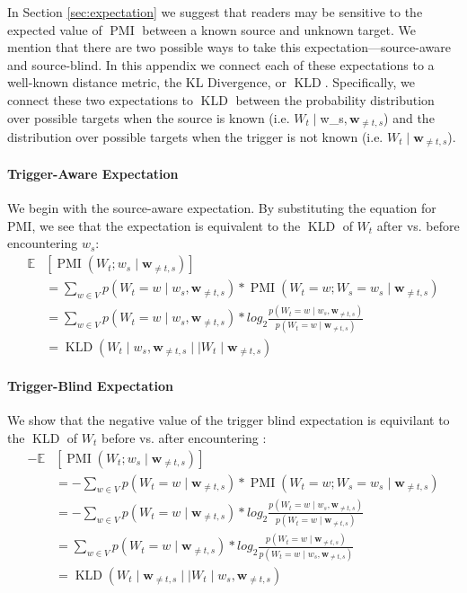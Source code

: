 \documentclass[12pt]{article}
\newcommand{\targetindex}{t}
\newcommand{\sourceindex}{s}
\newcommand{\bothindex}{\targetindex, \sourceindex}
\newcommand{\Target}{$W_{\targetindex}$\xspace}
\newcommand{\Targetmath}{W_{\targetindex}}
\newcommand{\source}{$w_{\sourceindex}$\xspace}
\newcommand{\Sourcemath}{W_{\sourceindex}}
\newcommand{\sourcemath}{w_{\sourceindex}\xspace}
\newcommand{\bw}{\mathbf{w}}
\newcommand{\maskbothmath}{\bw_{\neq \bothindex}}
\newcommand{\pmimath}{\operatorname{PMI}}
\newcommand{\pmi}{$\pmimath$\xspace}
\newcommand{\kldmath}{\operatorname{KLD}}
\newcommand{\kld}{$\kldmath$\xspace}
\begin{document}
In Section \ref{sec:expectation} we suggest that readers may be sensitive to the expected value of \pmi between a known source and unknown target. We mention that there are two possible ways to take this expectation---source-aware and source-blind. In this appendix we connect each of these expectations to a well-known distance metric, the KL Divergence, or \kld. Specifically, we connect these two expectations to \kld between the probability distribution over possible targets when the source is known (i.e. $\Targetmath \mid \source, \maskbothmath$) and the distribution over possible targets when the trigger is not known (i.e. $\Targetmath \mid \maskbothmath$).

\paragraph{Trigger-Aware Expectation} We begin with the source-aware expectation. By substituting the equation for PMI, we see that the expectation is equivalent to the \kld of \Target after vs. before encountering \source:
%
\begin{align}
    \mathbb{E}&[\pmimath(\Targetmath;\sourcemath \mid \maskbothmath)] \nonumber \\
    &= \sum_{w \in V} p(\Targetmath = w \mid \sourcemath, \maskbothmath) * \pmimath(\Targetmath = w; \Sourcemath = \sourcemath \mid \maskbothmath) \\
    &= \sum_{w \in V} p(\Targetmath = w \mid \sourcemath, \maskbothmath) * log_2 \frac{p(\Targetmath = w \mid \sourcemath, \maskbothmath)}{p(\Targetmath = w \mid \maskbothmath)} \\
    &= \kldmath(\Targetmath \mid \sourcemath, \maskbothmath \mid \mid \Targetmath \mid \maskbothmath )
\end{align}

\paragraph{Trigger-Blind Expectation} We show that the negative value of the trigger blind expectation is equivilant to the \kld of \Target before vs. after encountering \trigger:
%
\begin{align}
    - \mathbb{E}&[\pmimath(\Targetmath;\sourcemath \mid \maskbothmath)] \nonumber \\
    &= - \sum_{w \in V} p(\Targetmath = w \mid \maskbothmath) * \pmimath(\Targetmath = w; \Sourcemath = \sourcemath \mid \maskbothmath) \\
    &= - \sum_{w \in V} p(\Targetmath = w \mid \maskbothmath) * log_2 \frac{p(\Targetmath = w \mid \sourcemath, \maskbothmath)}{p(\Targetmath = w \mid \maskbothmath)} \\
    &= \sum_{w \in V} p(\Targetmath = w \mid \maskbothmath) * log_2 \frac{p(\Targetmath = w \mid \maskbothmath)}{p(\Targetmath = w \mid \sourcemath, \maskbothmath)} \\
    &= \kldmath(\Targetmath \mid \maskbothmath \mid \mid \Targetmath \mid \sourcemath, \maskbothmath )
\end{align}
\end{document}
